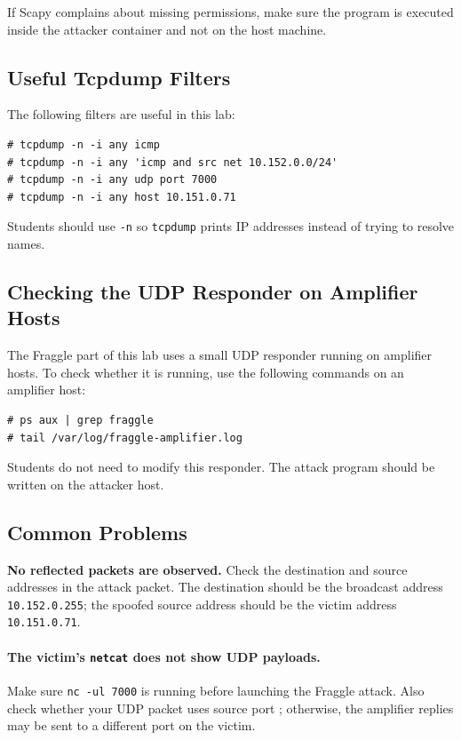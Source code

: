 If Scapy complains about missing permissions, make sure the program is executed
inside the attacker container and not on the host machine.


\subsection{Useful Tcpdump Filters}

The following filters are useful in this lab:

\begin{lstlisting}
# tcpdump -n -i any icmp
# tcpdump -n -i any 'icmp and src net 10.152.0.0/24'
# tcpdump -n -i any udp port 7000
# tcpdump -n -i any host 10.151.0.71
\end{lstlisting}

Students should use \texttt{-n} so \texttt{tcpdump} prints IP addresses instead
of trying to resolve names.


\subsection{Checking the UDP Responder on Amplifier Hosts}

The Fraggle part of this lab uses a small UDP responder running on amplifier
hosts. To check whether it is running, use the following commands on an
amplifier host:

\begin{lstlisting}
# ps aux | grep fraggle
# tail /var/log/fraggle-amplifier.log
\end{lstlisting}

Students do not need to modify this responder. The attack program should be
written on the attacker host.


\subsection{Common Problems}

\noindent\textbf{No reflected packets are observed.}
Check the destination and source addresses in the attack packet. The destination
should be the broadcast address \texttt{10.152.0.255}; the spoofed source
address should be the victim address \texttt{10.151.0.71}.

\paragraph{The victim's \texttt{netcat} does not show UDP payloads.}
Make sure \texttt{nc -ul 7000} is running before launching the Fraggle attack.
Also check whether your UDP packet uses source port \fraggleport; otherwise, the
amplifier replies may be sent to a different port on the victim.

